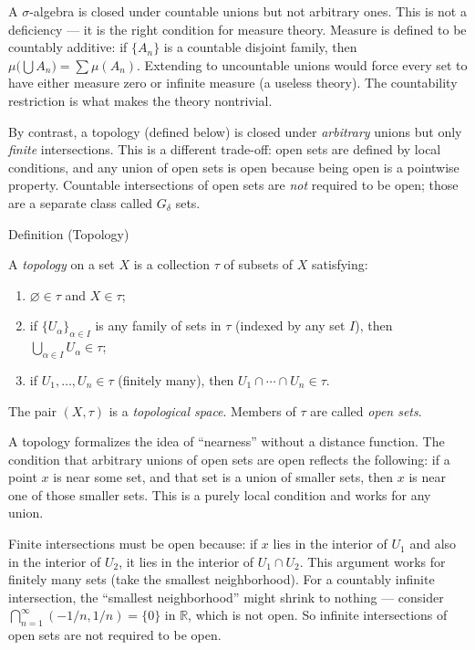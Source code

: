 \begin{remark*}
A $\sigma$-algebra is closed under countable unions but not arbitrary ones.
This is not a deficiency — it is the right condition for measure theory.
Measure is defined to be countably additive: if $\{A_n\}$ is a countable
disjoint family, then $\mu\bigl(\bigcup A_n\bigr) = \sum \mu(A_n)$. Extending
to uncountable unions would force every set to have either measure zero or
infinite measure (a useless theory). The countability restriction is what makes
the theory nontrivial.

By contrast, a topology (defined below) is closed under \emph{arbitrary}
unions but only \emph{finite} intersections. This is a different trade-off:
open sets are defined by local conditions, and any union of open sets is open
because being open is a pointwise property. Countable intersections of open
sets are \emph{not} required to be open; those are a separate class called
$G_\delta$ sets.
\end{remark*}


\begin{definitionbox}{Definition (Topology)}
\begin{definition}[Topology]\label{def:topology-defn}
A \emph{topology} on a set $X$ is a collection $\tau$ of subsets of $X$
satisfying:
\begin{enumerate}[label=(\roman*)]
\item $\varnothing \in \tau$ and $X \in \tau$;
\item if $\{U_\alpha\}_{\alpha \in I}$ is any family of sets in $\tau$ (indexed
  by any set $I$), then $\bigcup_{\alpha \in I} U_\alpha \in \tau$;
\item if $U_1, \dots, U_n \in \tau$ (finitely many), then $U_1 \cap \cdots
  \cap U_n \in \tau$.
\end{enumerate}
The pair $(X, \tau)$ is a \emph{topological space}. Members of $\tau$ are
called \emph{open sets}.
\end{definition}
\end{definitionbox}

\begin{remark*}
A topology formalizes the idea of ``nearness'' without a distance function.
The condition that arbitrary unions of open sets are open reflects the
following: if a point $x$ is near some set, and that set is a union of smaller
sets, then $x$ is near one of those smaller sets. This is a purely local
condition and works for any union.

Finite intersections must be open because: if $x$ lies in the interior of
$U_1$ and also in the interior of $U_2$, it lies in the interior of $U_1 \cap
U_2$. This argument works for finitely many sets (take the smallest
neighborhood). For a countably infinite intersection, the ``smallest
neighborhood'' might shrink to nothing — consider $\bigcap_{n=1}^\infty
(-1/n, 1/n) = \{0\}$ in $\mathbb{R}$, which is not open. So infinite
intersections of open sets are not required to be open.
\end{remark*}

